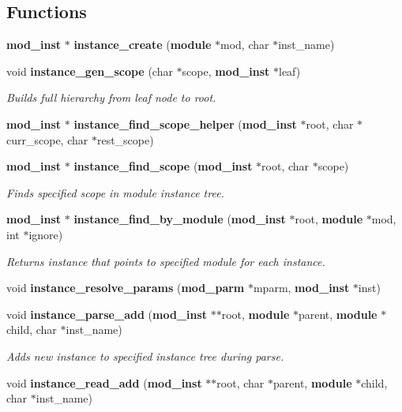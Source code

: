 \subsection*{Functions}
\begin{CompactItemize}
\item 
{\bf mod\_\-inst} $\ast$ {\bf instance\_\-create} ({\bf module} $\ast$mod, char $\ast$inst\_\-name)
\item 
void {\bf instance\_\-gen\_\-scope} (char $\ast$scope, {\bf mod\_\-inst} $\ast$leaf)
\begin{CompactList}\small\item\em Builds full hierarchy from leaf node to root.\item\end{CompactList}\item 
{\bf mod\_\-inst} $\ast$ {\bf instance\_\-find\_\-scope\_\-helper} ({\bf mod\_\-inst} $\ast$root, char $\ast$curr\_\-scope, char $\ast$rest\_\-scope)
\item 
{\bf mod\_\-inst} $\ast$ {\bf instance\_\-find\_\-scope} ({\bf mod\_\-inst} $\ast$root, char $\ast$scope)
\begin{CompactList}\small\item\em Finds specified scope in module instance tree.\item\end{CompactList}\item 
{\bf mod\_\-inst} $\ast$ {\bf instance\_\-find\_\-by\_\-module} ({\bf mod\_\-inst} $\ast$root, {\bf module} $\ast$mod, int $\ast$ignore)
\begin{CompactList}\small\item\em Returns instance that points to specified module for each instance.\item\end{CompactList}\item 
void {\bf instance\_\-resolve\_\-params} ({\bf mod\_\-parm} $\ast$mparm, {\bf mod\_\-inst} $\ast$inst)
\item 
void {\bf instance\_\-parse\_\-add} ({\bf mod\_\-inst} $\ast$$\ast$root, {\bf module} $\ast$parent, {\bf module} $\ast$child, char $\ast$inst\_\-name)
\begin{CompactList}\small\item\em Adds new instance to specified instance tree during parse.\item\end{CompactList}\item 
void {\bf instance\_\-read\_\-add} ({\bf mod\_\-inst} $\ast$$\ast$root, char $\ast$parent, {\bf module} $\ast$child, char $\ast$inst\_\-name)

\end{CompactItemize}
